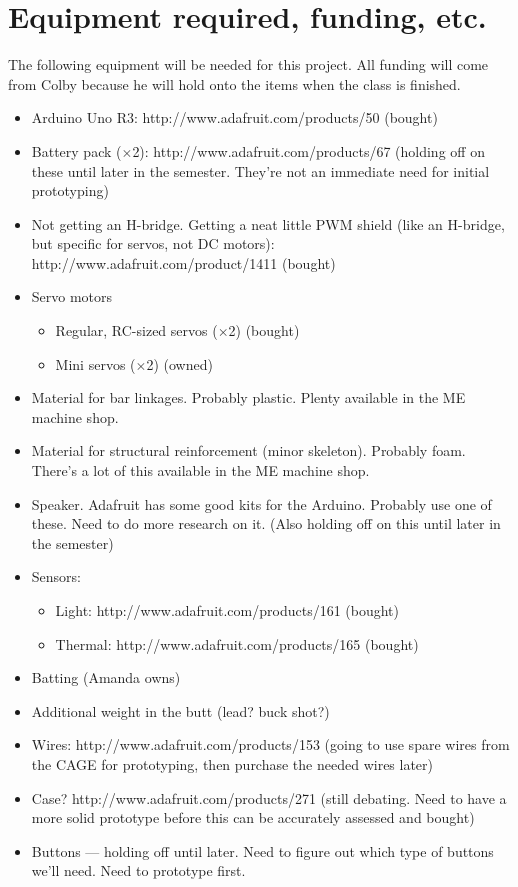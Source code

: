 \documentclass{article}
\begin{document}
\section{Equipment required, funding, etc.}
The following equipment will be needed for this project. All funding will come from Colby because he will hold onto the items when the class is finished.
\begin{itemize}
    \item Arduino Uno R3: http://www.adafruit.com/products/50 (bought)
    \item Battery pack ($\times$2): http://www.adafruit.com/products/67 (holding off on these until later in the semester. They're not an immediate need for initial prototyping)
    \item Not getting an H-bridge. Getting a neat little PWM shield (like an H-bridge, but specific for servos, not DC motors): http://www.adafruit.com/product/1411 (bought)
    \item Servo motors
    \begin{itemize}
        \item Regular, RC-sized servos ($\times$2) (bought)
        \item Mini servos ($\times$2) (owned)
    \end{itemize}
    \item Material for bar linkages. Probably plastic. Plenty available in the ME machine shop.
    \item Material for structural reinforcement (minor skeleton). Probably foam. There's a lot of this available in the ME machine shop.
    \item Speaker. Adafruit has some good kits for the Arduino. Probably use one of these. Need to do more research on it. (Also holding off on this until later in the semester)
    \item Sensors:
    \begin{itemize}
        \item Light: http://www.adafruit.com/products/161 (bought)
        \item Thermal: http://www.adafruit.com/products/165 (bought)
    \end{itemize}
    \item Batting (Amanda owns)
    \item Additional weight in the butt (lead? buck shot?)
    \item Wires: http://www.adafruit.com/products/153 (going to use spare wires from the CAGE for prototyping, then purchase the needed wires later)
    \item Case? http://www.adafruit.com/products/271 (still debating. Need to have a more solid prototype before this can be accurately assessed and bought)
    \item Buttons --- holding off until later. Need to figure out which type of buttons we'll need. Need to prototype first.
\end{itemize}
\end{document}
